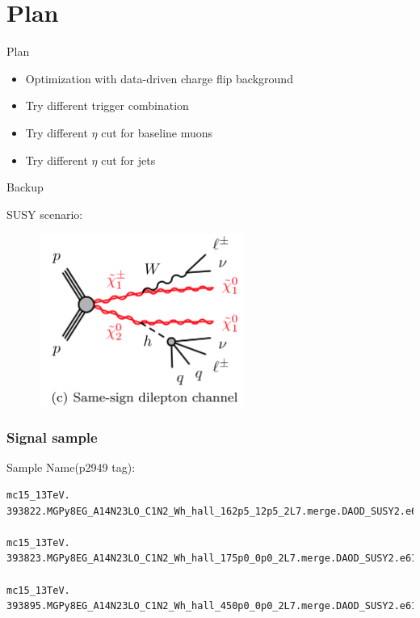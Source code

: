 \documentclass[mathserif,serif]{beamer}
\begin{document}
\section{Plan}
\begin{frame}{Plan}
\begin{itemize}
\item Optimization with data-driven charge flip background
\item Try different trigger combination
\item Try different $\eta$ cut for baseline muons
\item Try different $\eta$ cut for jets
\end{itemize}
\end{frame}

\begin{frame}
\begin{center}
\huge
Backup
\end{center}
\end{frame}

\begin{frame}
\small
SUSY scenario:\\
\begin{figure}
\includegraphics[width=0.6\textwidth]{data/photo/Wh.png}
\end{figure}
\end{frame}

\begin{frame}[fragile]
\frametitle{Signal sample}
\small
Sample Name(p2949 tag):
\tiny
\begin{verbatim}
mc15_13TeV.
393822.MGPy8EG_A14N23LO_C1N2_Wh_hall_162p5_12p5_2L7.merge.DAOD_SUSY2.e6153_a766_a821_r7676_p2949

mc15_13TeV.
393823.MGPy8EG_A14N23LO_C1N2_Wh_hall_175p0_0p0_2L7.merge.DAOD_SUSY2.e6153_a766_a821_r7676_p2949

mc15_13TeV.
393895.MGPy8EG_A14N23LO_C1N2_Wh_hall_450p0_0p0_2L7.merge.DAOD_SUSY2.e6153_a766_a821_r7676_p2949
\end{verbatim}
\end{frame}
\end{document}
